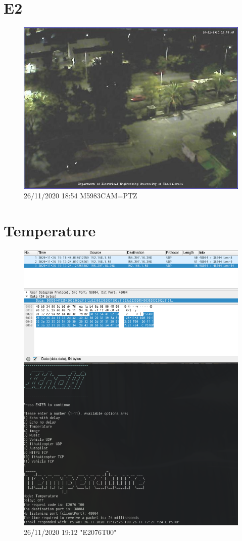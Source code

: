 \documentclass[hidelinks, 12pt, a4paper]{article}
\begin{document}
\section{E2}

\begin{figure}[h!]
\centering
	\includegraphics[height=.35\textheight, width=\textwidth]{assets/session1/image_ptz.jpg}
	\caption{26/11/2020 18:54 M5983CAM=PTZ} 
\end{figure}

\section{Temperature}

\begin{figure}[h!]
\centering
	\includegraphics[height=.38\textheight, width=.8\textwidth]{assets/session1/temp.png}
	\caption{26/11/2020 19:12 "E2076T00"} 
\end{figure}
\end{document}
